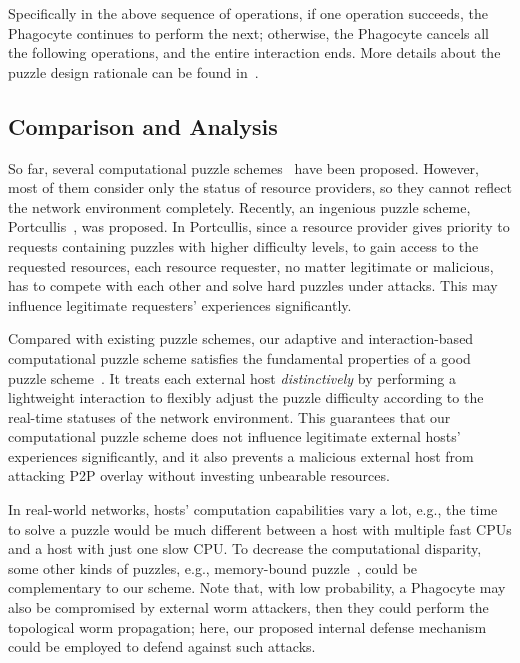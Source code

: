 \documentclass[times,10pt,twocolumn]{article}
\begin{document}
Specifically in the above sequence of operations, if one operation
succeeds, the Phagocyte continues to perform the next; otherwise,
the Phagocyte cancels all the following operations, and the entire
interaction ends. More details about the puzzle design rationale can
be found in~\cite{puzzle-Chen09}.



\subsection{Comparison and Analysis}


So far, several computational puzzle
schemes~\cite{DworkN92,JuelsB99,Merkle78} have been proposed.
However, most of them consider only the status of resource
providers, so they cannot reflect the network environment
completely. Recently, an ingenious puzzle scheme,
Portcullis~\cite{ParnoWSPMH07}, was proposed. In Portcullis, since a
resource provider gives priority to requests containing puzzles with
higher difficulty levels, to gain access to the requested resources,
each resource requester, no matter legitimate or malicious, has to
compete with each other and solve hard puzzles under attacks. This
may influence legitimate requesters' experiences significantly.

Compared with existing puzzle schemes, our adaptive and
interaction-based computational puzzle scheme satisfies the
fundamental properties of a good puzzle scheme~\cite{JuelsB99}. It
treats each external host \emph{distinctively} by performing a
lightweight interaction to flexibly adjust the puzzle difficulty
according to the real-time statuses of the network environment. This
guarantees that our computational puzzle scheme does not influence
legitimate external hosts' experiences significantly, and it also
prevents a malicious external host from attacking P2P overlay
without investing unbearable resources.


In real-world networks, hosts' computation capabilities vary a lot,
e.g., the time to solve a puzzle would be much different between a
host with multiple fast CPUs and a host with just one slow CPU. To
decrease the computational disparity, some other kinds of puzzles,
e.g., memory-bound puzzle~\cite{AbadiBMW05}, could be complementary
to our scheme. Note that, with low probability, a Phagocyte may also
be compromised by external worm attackers, then they could perform
the topological worm propagation; here, our proposed internal
defense mechanism could be employed to defend against such attacks.
\end{document}
